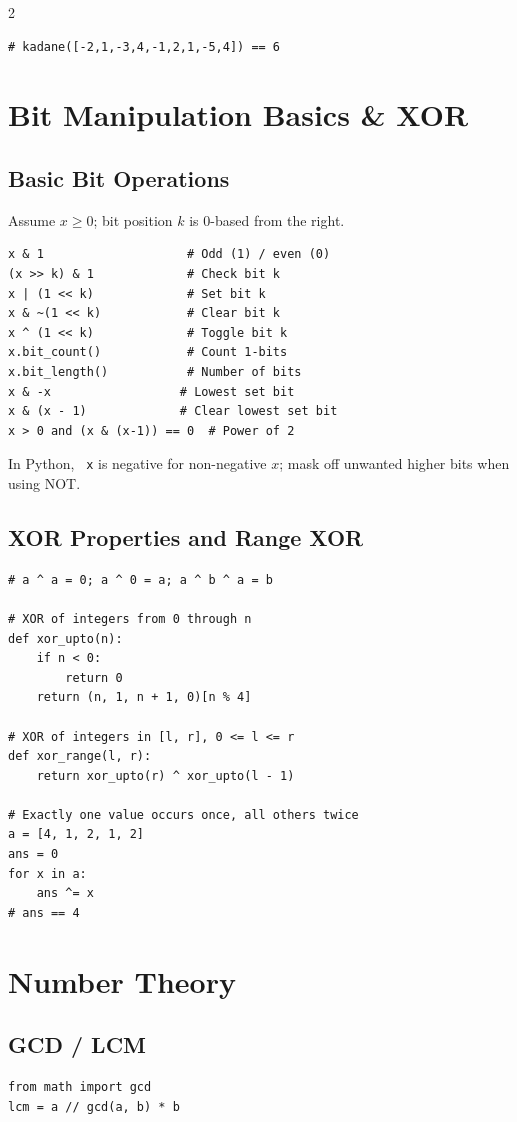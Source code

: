 \documentclass[9pt,a4paper]{extarticle}
\newcommand{\code}[1]{\texttt{#1}}
\begin{document}
\begin{multicols}{2}
\begin{lstlisting}
# kadane([-2,1,-3,4,-1,2,1,-5,4]) == 6
\end{lstlisting}

\section{Bit Manipulation Basics \& XOR}

\subsection{Basic Bit Operations}
Assume $x\ge0$; bit position $k$ is 0-based from the right.
\begin{lstlisting}
x & 1                    # Odd (1) / even (0)
(x >> k) & 1             # Check bit k
x | (1 << k)             # Set bit k
x & ~(1 << k)            # Clear bit k
x ^ (1 << k)             # Toggle bit k
x.bit_count()            # Count 1-bits
x.bit_length()           # Number of bits
x & -x                  # Lowest set bit
x & (x - 1)             # Clear lowest set bit
x > 0 and (x & (x-1)) == 0  # Power of 2
\end{lstlisting}
In Python, \code{\string~x} is negative for non-negative $x$; mask off unwanted higher bits when using NOT.

\subsection{XOR Properties and Range XOR}
\begin{lstlisting}
# a ^ a = 0; a ^ 0 = a; a ^ b ^ a = b

# XOR of integers from 0 through n
def xor_upto(n):
    if n < 0:
        return 0
    return (n, 1, n + 1, 0)[n % 4]

# XOR of integers in [l, r], 0 <= l <= r
def xor_range(l, r):
    return xor_upto(r) ^ xor_upto(l - 1)

# Exactly one value occurs once, all others twice
a = [4, 1, 2, 1, 2]
ans = 0
for x in a:
    ans ^= x
# ans == 4
\end{lstlisting}

\section{Number Theory}

\subsection{GCD / LCM}
\begin{lstlisting}
from math import gcd
lcm = a // gcd(a, b) * b


\end{lstlisting}
\end{multicols}
\end{document}
